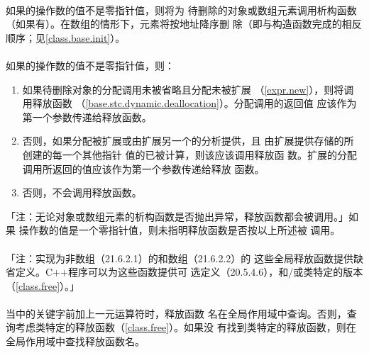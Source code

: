 \paragraph{}
如果的操作数的值不是零指针值，则将为
待删除的对象或数组元素调用析构函数（如果有）。在数组的情形下，元素将按地址降序删
除（即与构造函数完成的相反顺序；见\ref{class.base.init}）。

\paragraph{}
如果的操作数的值不是零指针值，则：
\begin{enumerate}
  \item{如果待删除对象的分配调用未被省略且分配未被扩展
    （\ref{expr.new}），则将调用释放函数
    （\ref{base.stc.dynamic.deallocation}）。分配调用的返回值
    应该作为第一个参数传递给释放函数。}
  \item{否则，如果分配被扩展或由扩展另一个的分析提供，且
    由扩展提供存储的所创建的每一个其他指针
    值的已被计算，则该应该调用释放函
    数。扩展的分配调用所返回的值应该作为第一个参数传递给释放
    函数。}
  \item{否则，不会调用释放函数。}
\end{enumerate}
「注：无论对象或数组元素的析构函数是否抛出异常，释放函数都会被调用。」如果
操作数的值是一个零指针值，则未指明释放函数是否按以上所述被
调用。

\paragraph{}
「注：实现为非数组（21.6.2.1）的和数组（21.6.2.2）的
这些全局释放函数提供缺省定义。C++程序可以为这些函数提供可
选定义（20.5.4.6），和/或类特定的版本（\ref{class.free}）。」

\paragraph{}
当中的关键字前加上一元\tm{::}运算符时，释放函数
名在全局作用域中查询。否则，查询考虑类特定的释放函数（\ref{class.free}）。如果没
有找到类特定的释放函数，则在全局作用域中查找释放函数名。

